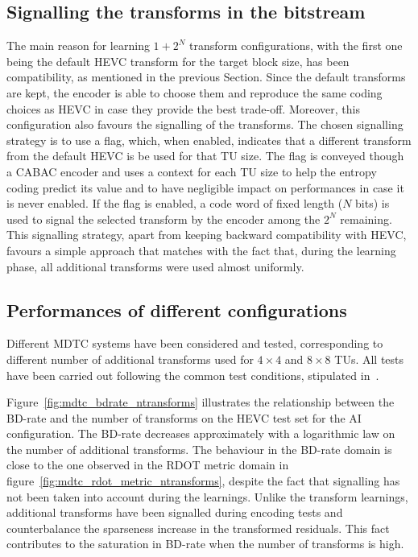 \documentclass[11pt,a4paper,openright,twoside]{book}
\numberwithin{equation}{section} %
\numberwithin{figure}{section} %
\numberwithin{table}{section} %
\begin{document}
\subsection{Signalling the transforms in the bitstream}
\label{sub:mdtc_signalling}

The main reason for learning $1+2^N$ transform configurations, with the first
one being the default \ac{HEVC} transform for the target block size, has been
compatibility, as mentioned in the previous Section.
Since the default transforms are kept, the encoder is able to choose them and
reproduce the same coding choices as \ac{HEVC} in case they provide the best
trade-off.
Moreover, this configuration also favours the signalling of the transforms.
The chosen signalling strategy is to use a flag, which, when enabled,
indicates that a different transform from the default \ac{HEVC} is be used for
that \ac{TU} size.
The flag is conveyed though a \ac{CABAC} encoder and uses a context for each
\ac{TU} size to help the entropy coding predict its value and to have
negligible impact on performances in case it is never enabled.
If the flag is enabled, a code word of fixed length ($N$ bits) is used to
signal the selected transform by the encoder among the $2^N$ remaining.
This signalling strategy, apart from keeping backward compatibility with
\ac{HEVC}, favours a simple approach that matches with the fact that, during
the learning phase, all additional transforms were used almost uniformly.

\subsection{Performances of different configurations}
\label{sub:mdtc_performances}

Different \ac{MDTC} systems have been considered and tested, corresponding to
different number of additional transforms used for $4\times4$ and $8\times8$
\acp{TU}.
All tests have been carried out following the common test conditions,
stipulated in~\cite{bossen-12-common-test-conditions}.

Figure~\ref{fig:mdtc_bdrate_ntransforms} illustrates the relationship between
the \ac{BD}-rate and the number of transforms on the \ac{HEVC} test set for
the \ac{AI} configuration.
The \ac{BD}-rate decreases approximately with a logarithmic law on the number
of additional transforms.
The behaviour in the \ac{BD}-rate domain is close to the one observed in the
\ac{RDOT} metric domain in figure~\ref{fig:mdtc_rdot_metric_ntransforms},
despite the fact that signalling has not been taken into account during the
learnings.
Unlike the transform learnings, additional transforms have been signalled
during encoding tests and counterbalance the sparseness increase in the
transformed residuals.
This fact contributes to the saturation in \ac{BD}-rate when the number of
transforms is high.
\end{document}
